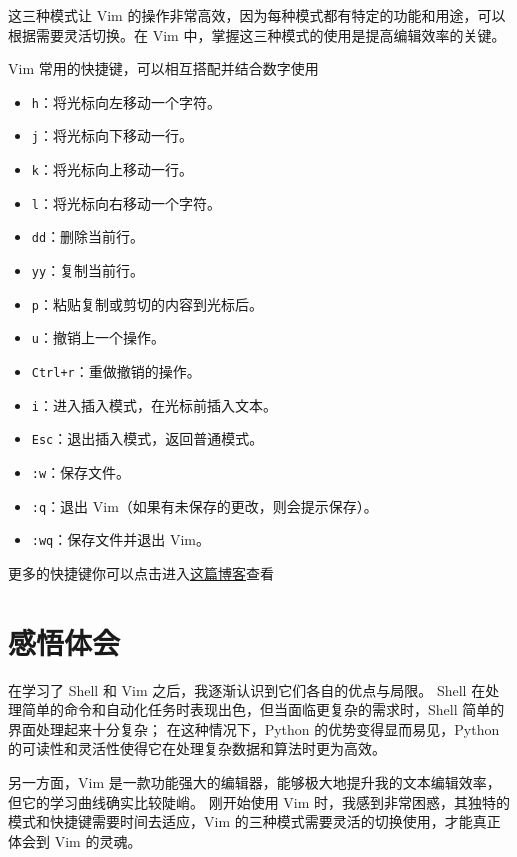 \documentclass[16pt]{lzc}
\begin{document}
        这三种模式让 Vim 的操作非常高效，因为每种模式都有特定的功能和用途，可以根据需要灵活切换。在 Vim 中，掌握这三种模式的使用是提高编辑效率的关键。


        \newpage
        Vim 常用的快捷键，可以相互搭配并结合数字使用
        \begin{itemize}
            \item \texttt{h}：将光标向左移动一个字符。
            \item \texttt{j}：将光标向下移动一行。
            \item \texttt{k}：将光标向上移动一行。
            \item \texttt{l}：将光标向右移动一个字符。
            \item \texttt{dd}：删除当前行。
            \item \texttt{yy}：复制当前行。
            \item \texttt{p}：粘贴复制或剪切的内容到光标后。
            \item \texttt{u}：撤销上一个操作。
            \item \texttt{Ctrl+r}：重做撤销的操作。
            \item \texttt{i}：进入插入模式，在光标前插入文本。
            \item \texttt{Esc}：退出插入模式，返回普通模式。
            \item \texttt{:w}：保存文件。
            \item \texttt{:q}：退出 Vim（如果有未保存的更改，则会提示保存）。
            \item \texttt{:wq}：保存文件并退出 Vim。
        \end{itemize}

        更多的快捷键你可以点击进入\href{https://www.cnblogs.com/markleaf/p/7808817.html}{这篇博客}查看


    \section{感悟体会}\label{sec:}
        在学习了 Shell 和 Vim 之后，我逐渐认识到它们各自的优点与局限。
        Shell 在处理简单的命令和自动化任务时表现出色，但当面临更复杂的需求时，Shell 简单的界面处理起来十分复杂；
        在这种情况下，Python 的优势变得显而易见，Python 的可读性和灵活性使得它在处理复杂数据和算法时更为高效。

        另一方面，Vim 是一款功能强大的编辑器，能够极大地提升我的文本编辑效率，但它的学习曲线确实比较陡峭。
        刚开始使用 Vim 时，我感到非常困惑，其独特的模式和快捷键需要时间去适应，Vim 的三种模式需要灵活的切换使用，才能真正体会到 Vim 的灵魂。
\end{document}
